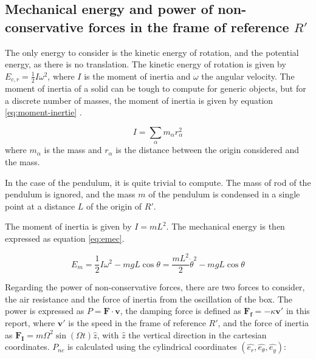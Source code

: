 \documentclass[a4paper,12pt,twoside]{article}
\begin{document}
\subsection{Mechanical energy and power of non-conservative forces in the frame of reference $R'$}
The only energy to consider is the kinetic energy of rotation, and the potential energy, as there is no translation.
The kinetic energy of rotation is given by $E_{c,r} = \frac{1}{2}I\omega^2$, where $I$ is the moment of inertia and $\omega$ the angular velocity.
The moment of inertia of a solid can be tough to compute for generic objects, but for a discrete number of masses, the moment of inertia is given by equation \ref{eq:moment-inertie} \cite{ans:moment-inertie}.

\begin{equation}
	I = \sum_\alpha m_\alpha r_\alpha^2
	\label{eq:moment-inertie}
\end{equation}
where $m_\alpha$ is the mass and $r_\alpha$ is the distance between the origin considered and the mass.

In the case of the pendulum, it is quite trivial to compute.
The mass of rod of the pendulum is ignored, and the mass $m$ of the pendulum is condensed in a single point at a distance $L$ of the origin of $R'$.

The moment of inertia is given by $I=mL^2$. %
The mechanical energy is then expressed as equation \ref{eq:emec}.

\begin{equation}
	E_m = \frac{1}{2}I\omega^2 - mgL\cos\theta =  \frac{mL^2}{2}\dot{\theta}^2 - mgL\cos\theta
	\label{eq:emec}
\end{equation}

Regarding the power of non-conservative forces, there are two forces to consider, the air resistance and the force of inertia from the oscillation of the box.
The power is expressed as $P = \mathbf{F}\cdot\mathbf{v}$, the damping force is defined as $\mathbf{F_f} = -\kappa\mathbf{v'}$ in this report, where $\mathbf{v'}$ is the speed in the frame of reference $R'$, and the force of inertia as $\mathbf{F_I} = m \Omega^2 \sin(\Omega t) \hat{z}$, with $\hat{z}$ the vertical direction in the cartesian coordinates. $P_{nc}$ is calculated using the cylindrical coordinates $(\hat{e_r}, \hat{e_\theta}, \hat{e_y})$:
\end{document}
